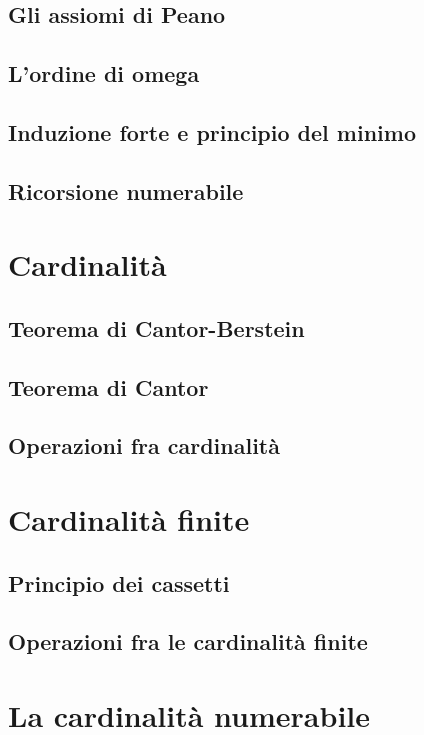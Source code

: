 \documentclass[11pt]{scrartcl}
\begin{document}
\subsection{Gli assiomi di Peano}
\newpage
\subsection{L'ordine di omega}
\newpage
\subsection{Induzione forte e principio del minimo}
\newpage
\subsection{Ricorsione numerabile}




\newpage
\section{Cardinalità}
\subsection{Teorema di Cantor-Berstein}
\newpage
\subsection{Teorema di Cantor}
\newpage
\subsection{Operazioni fra cardinalità}





\newpage
\section{Cardinalità finite}
\subsection{Principio dei cassetti}
\newpage
\subsection{Operazioni fra le cardinalità finite}




\newpage
\section{La cardinalità numerabile}
\end{document}
